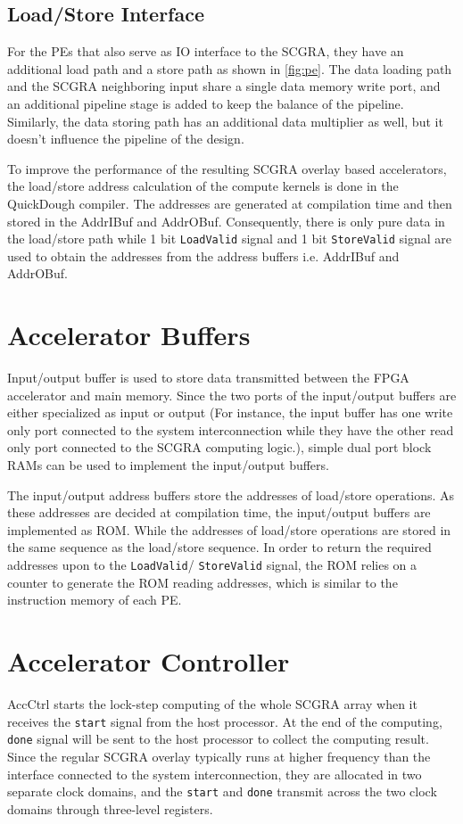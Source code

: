 \subsection{Load/Store Interface}
For the PEs that also serve as IO interface to the SCGRA, they have an additional load path and a store path as shown in \ref{fig:pe}. The data loading path and the SCGRA neighboring input share a single data memory write port, and an additional pipeline stage is added to keep the balance of the pipeline. Similarly, the data storing path has an additional data multiplier as well, but it doesn't influence the pipeline of the design. 

To improve the performance of the resulting SCGRA overlay based accelerators, the load/store address calculation of the compute kernels is done in the QuickDough compiler. The addresses are generated at compilation time and then stored in the AddrIBuf and AddrOBuf. Consequently, there is only pure data in the load/store path while 1 bit \texttt{LoadValid} signal and 1 bit \texttt{StoreValid} signal are used to obtain the addresses from the address buffers i.e. AddrIBuf and AddrOBuf.

\section{Accelerator Buffers}
Input/output buffer is used to store data transmitted between the FPGA accelerator and main memory. Since the two ports of the input/output buffers are either specialized as input or output (For instance, the input buffer has one write only port connected to the system interconnection while they have the other read only port connected to the SCGRA computing logic.), simple dual port block RAMs can be used to implement the input/output buffers. 

The input/output address buffers store the addresses of load/store operations. As these addresses are decided at compilation time, the input/output buffers are implemented as ROM. While the addresses of load/store operations are stored in the same sequence as the load/store sequence. In order to return the required addresses upon to the \texttt{LoadValid}/ \texttt{StoreValid} signal, the ROM relies on a counter to generate the ROM reading addresses, which is similar to the instruction memory of each PE. 

\section{Accelerator Controller}
AccCtrl starts the lock-step computing of the whole SCGRA array when it receives the \texttt{start} signal from the host processor. At the end of the computing, \texttt{done} signal will be sent to the host processor to collect the computing result. Since the regular SCGRA overlay typically runs at higher frequency than the interface connected to the system interconnection, they are allocated in two separate clock domains, and the \texttt{start} and \texttt{done} transmit across the two clock domains through three-level registers.

